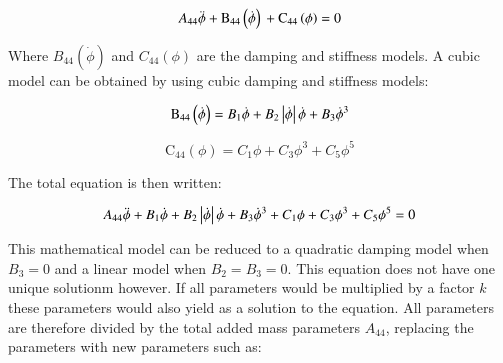             
    
    \begin{equation}
A_{44} \ddot{\phi} \\ + \operatorname{B_{44}}\left(\dot{\phi}\right) \\ + \operatorname{C_{44}}\left(\phi\right) = 0
\label{eq:equation}
\end{equation}

    

    Where \(B_{44}(\dot{\phi})\) and \(C_{44}(\phi)\) are the damping and
stiffness models. A cubic model can be obtained by using cubic damping
and stiffness models:
 
            
    
    \begin{equation}
\operatorname{B_{44}}\left(\dot{\phi}\right) = B_{1} \dot{\phi} \\ + B_{2} \left|{\dot{\phi}}\right| \dot{\phi} \\ + B_{3} \dot{\phi}^{3}
\label{eq:equation}
\end{equation}

    
 
            
    
    \begin{equation}
\operatorname{C_{44}}\left(\phi\right) = C_{1} \phi + C_{3} \phi^{3} + C_{5} \phi^{5}
\label{eq:equation}
\end{equation}

    

    The total equation is then written:
 
            
    
    \begin{equation}
A_{44} \ddot{\phi} \\ + B_{1} \dot{\phi} \\ + B_{2} \left|{\dot{\phi}}\right| \dot{\phi} \\ + B_{3} \dot{\phi}^{3} \\ + C_{1} \phi \\ + C_{3} \phi^{3} \\ + C_{5} \phi^{5} = 0
\label{eq:equation}
\end{equation}

    

    This mathematical model can be reduced to a quadratic damping model when
\(B_3=0\) and a linear model when \(B_2=B_3=0\). This equation does not
have one unique solutionm however. If all parameters would be multiplied
by a factor \(k\) these parameters would also yield as a solution to the
equation. All parameters are therefore divided by the total added mass
parameters \(A_{44}\), replacing the parameters with new parameters such
as:
 
